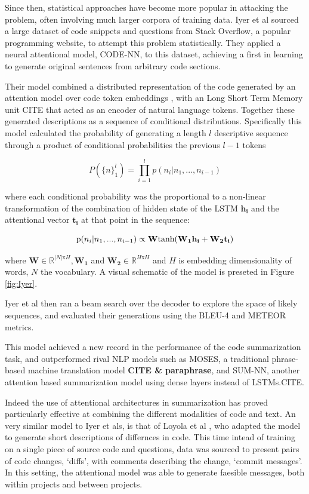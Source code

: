 Since then, statistical approaches have become more popular in attacking the problem, often involving much larger corpora of training data.
Iyer et al \cite{iyer_summarizing_2016} sourced a large dataset of code snippets and questions from Stack Overflow, a popular programming website, to attempt this problem statistically.
They applied a neural attentional model, CODE-NN, to this dataset, achieving a first in learning to generate original sentences from arbitrary code sections.   

Their model combined a distributed representation of the code generated by an attention model over code token embeddings \cite{luong_effective_2015}, with an Long Short Term Memory unit CITE  that acted as an encoder of natural language tokens. Together these generated descriptions as a sequence of conditional distributions. 
Specifically this model calculated the probability of generating a length $l$
descriptive sequence through a product of conditional probabilities the previous $l-1$ tokens

$$P(\{n\}_1^l) = \prod_{i=1}^lp(n_i | n_1, ..., n_{i-1} ) $$

where each conditional probability was the proportional to a non-linear transformation of the combination of hidden state of the LSTM $\mathbf{h_i}$ and the attentional vector  $\mathbf{t_i}$ at that point in the sequence: 

$$\text p(n_i | n_1, ..., n_{i-1} ) \propto \mathbf{W}\text{tanh}(\mathbf{W_1h_i} + \mathbf{W_2t_i})$$

where $\mathbf{W} \in \mathbb{R}^{|N|\text{x} H}, \mathbf{W_1}$ and $\mathbf{W_2} \in \mathbb{R}^{H \text{x} H}$  and $ H$ is embedding dimensionality of words, $ N $ the vocabulary.\cite{iyer_summarizing_2016}
A visual schematic of the model is preseted in Figure \ref{fig:Iyer}.

Iyer et al then ran a beam search over the decoder to explore the space of likely sequences, and evaluated their generations using the BLEU-4 and METEOR metrics.

This model achieved a new record in the performance of the code summarization task, and outperformed rival NLP models such as MOSES, a traditional phrase-based machine translation model \textbf{CITE \& paraphrase}, and SUM-NN, another attention based summarization model using dense layers instead of LSTMs.CITE.

Indeed the use of attentional architectures in summarization has proved particularly effective at combining the different modalities of code and text.
An very similar model to Iyer et als, is that of Loyola et al \cite{loyola_neural_2017}, who adapted the model to generate short descriptions of differnces in code. 
This time intead of training on a single piece of source code and questions, data was sourced to present pairs of code changes, `diffs', with comments describing the change, `commit messages'. 
In this setting, the attentional model was able to generate faesible messages, both within projects and between projects.

